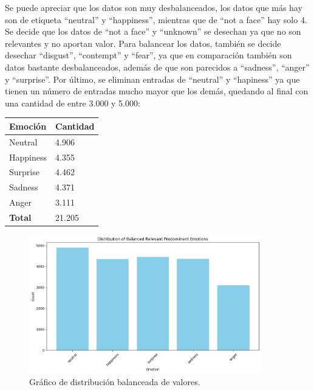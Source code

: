 \documentclass[12pt]{report} %
\begin{document}
Se puede apreciar que los datos son muy desbalanceados, los datos que más hay son de etiqueta “neutral” y “happiness”, mientras que de “not a face” hay solo 4. Se decide que los datos de “not a face” y “unknown” se desechan ya que no son relevantes y no aportan valor. Para balancear los datos, también se decide desechar “disgust”, “contempt” y “fear”, ya que en comparación también son datos bastante desbalanceados, además de que son parecidos a “sadness”, “anger” y “surprise”. Por último, se eliminan entradas de “neutral” y “hapiness” ya que tienen un número de entradas mucho mayor que los demás, quedando al final con una cantidad de entre 3.000 y 5.000:

\begin{table}[H]
	{
	  \begin{tabular}{|P{9cm}|P{4cm}|}
		\hline
		{\textbf{Emoción}} & {\textbf{Cantidad}} \\
		\hline
		Neutral & 4.906 \\
		\hline
		Happiness & 4.355 \\
		\hline
		Surprise & 4.462 \\
		\hline
		Sadness & 4.371 \\
		\hline
		Anger & 3.111 \\
		\hline
		{\textbf{Total}} & 21.205 \\
		\hline
	  \end{tabular}
	}
\end{table}

\begin{figure}[H]
	\centering
	\includegraphics[width=0.9\textwidth]{distribucionBalanceada.png}
	\caption{Gráfico de distribución balanceada de valores.}
	\label{fig:imagen30}
\end{figure}
\end{document}
